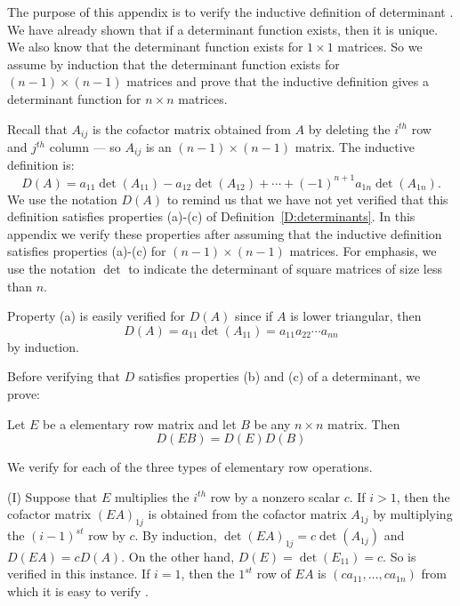 \label{A:det}

The purpose of this appendix is to verify the inductive
definition of determinant . We have already
shown that if a determinant function exists, then it is unique.
We also know that the determinant function exists for $1\times
1$ matrices. So we assume by induction that the determinant function
exists for $(n-1)\times(n-1)$ matrices and prove that the
inductive definition gives a determinant function for $n\times
n$ matrices.  

Recall that $A_{ij}$ is the cofactor matrix obtained from $A$ by
deleting the $i^{th}$ row and $j^{th}$ column --- so $A_{ij}$ is
an $(n-1)\times(n-1)$ matrix.  The inductive definition is:
\[
D(A) = a_{11}\det(A_{11})-a_{12}\det(A_{12})+\cdots 
+(-1)^{n+1}a_{1n}\det(A_{1n}).
\] 
We use the notation $D(A)$ to remind us that we have not yet
verified that this definition satisfies properties (a)-(c) of
Definition~\ref{D:determinants}.  In this appendix we verify these
properties after assuming that the inductive definition
satisfies properties (a)-(c) for $(n-1)\times (n-1)$ matrices.
For emphasis, we use the notation $\det$ to indicate the
determinant of square matrices of size less than $n$.

Property (a) is easily verified for $D(A)$ since if $A$ is lower
triangular, then
\[
D(A) = a_{11}\det(A_{11}) = a_{11}a_{22}\cdots a_{nn}
\]
by induction.

Before verifying that $D$ satisfies properties (b) and (c) of a
determinant, we prove:
\begin{lemma}
Let $E$ be a elementary row matrix and let $B$ be any $n\times
n$ matrix.   Then
\begin{equation} \label{e:proddetE}
D(EB) = D(E) D(B)
\end{equation} 
\end{lemma}

\proof We verify  for each of the three types of
elementary row operations. 

\noindent (I) Suppose that $E$ multiplies the $i^{th}$ row by a
nonzero scalar $c$.  If $i>1$, then the cofactor matrix
$(EA)_{1j}$ is obtained from the cofactor matrix $A_{1j}$ by
multiplying the $(i-1)^{st}$ row by $c$.  By induction,
$\det(EA)_{1j}= c\det(A_{1j})$ and $D(EA)=cD(A)$.  On the other
hand, $D(E)=\det(E_{11})=c$.  So  is verified in
this instance.  If $i=1$, then the $1^{st}$ row of $EA$ is
$(ca_{11},\ldots,ca_{1n})$ from which it is easy to verify
.


